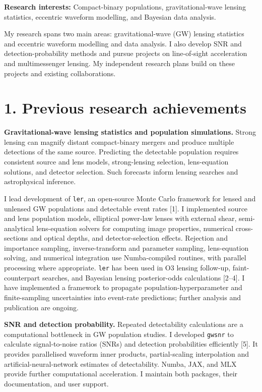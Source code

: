 \documentclass[11pt]{article}
\begin{document}
\textbf{Research interests:} Compact-binary populations, gravitational-wave lensing statistics, eccentric waveform modelling, and Bayesian data analysis.

My research spans two main areas: gravitational-wave (GW) lensing statistics and eccentric waveform modelling and data analysis. I also develop SNR and detection-probability methods and pursue projects on line-of-sight acceleration and multimessenger lensing. My independent research plans build on these projects and existing collaborations.

\section*{1. Previous research achievements}
\textbf{Gravitational-wave lensing statistics and population simulations.} Strong lensing can magnify distant compact-binary mergers and produce multiple detections of the same source. Predicting the detectable population requires consistent source and lens models, strong-lensing selection, lens-equation solutions, and detector selection. Such forecasts inform lensing searches and astrophysical inference.

I lead development of \texttt{ler}, an open-source Monte Carlo framework for lensed and unlensed GW populations and detectable event rates [1]. I implemented source and lens population models, elliptical power-law lenses with external shear, semi-analytical lens-equation solvers for computing image properties, numerical cross-sections and optical depths, and detector-selection effects. Rejection and importance sampling, inverse-transform and parameter sampling, lens-equation solving, and numerical integration use Numba-compiled routines, with parallel processing where appropriate. \texttt{ler} has been used in O3 lensing follow-up, faint-counterpart searches, and Bayesian lensing posterior-odds calculations [2--4]. I have implemented a framework to propagate population-hyperparameter and finite-sampling uncertainties into event-rate predictions; further analysis and publication are ongoing.

\textbf{SNR and detection probability.} Repeated detectability calculations are a computational bottleneck in GW population studies. I developed \texttt{gwsnr} to calculate signal-to-noise ratios (SNRs) and detection probabilities efficiently [5]. It provides parallelised waveform inner products, partial-scaling interpolation and artificial-neural-network estimates of detectability. Numba, JAX, and MLX provide further computational acceleration. I maintain both packages, their documentation, and user support.
\end{document}
